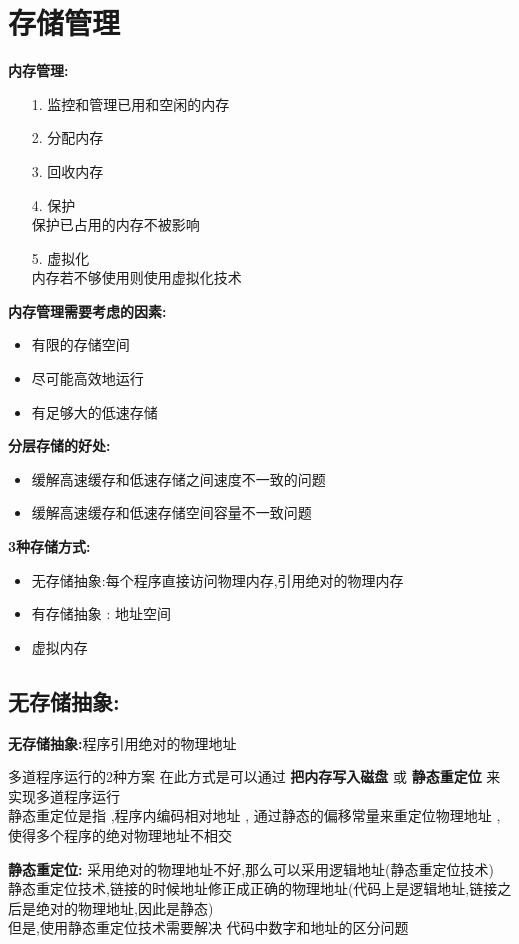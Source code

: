 \documentclass[UTF8,a4paper]{ctexart}
\newcommand{\spaceline}{\vspace{\baselineskip}}
\begin{document}
\section{存储管理}
\textbf{内存管理:}
\begin{itemize}
	\item [1.] 监控和管理已用和空闲的内存
	\item [2.] 分配内存
	\item [3.] 回收内存
	\item [4.] 保护\\
	      保护已占用的内存不被影响
	\item [5.] 虚拟化\\
	      内存若不够使用则使用虚拟化技术
\end{itemize}

\spaceline
\textbf{内存管理需要考虑的因素:}
\begin{itemize}
	\item 有限的存储空间
	\item 尽可能高效地运行
	\item 有足够大的低速存储
\end{itemize}

\spaceline
\textbf{分层存储的好处:}
\begin{itemize}
	\item 缓解高速缓存和低速存储之间速度不一致的问题
	\item 缓解高速缓存和低速存储空间容量不一致问题
\end{itemize}

\textbf{3种存储方式:}
\begin{itemize}
	\item 无存储抽象:每个程序直接访问物理内存,引用绝对的物理内存
	\item 有存储抽象 : 地址空间
	\item 虚拟内存
\end{itemize}

\subsection{无存储抽象:}

\spaceline
\textbf{无存储抽象:}程序引用绝对的物理地址

多道程序运行的2种方案
在此方式是可以通过 \textbf{把内存写入磁盘} 或 \textbf{静态重定位} 来实现多道程序运行 \\
静态重定位是指 ,程序内编码相对地址 , 通过静态的偏移常量来重定位物理地址 ,使得多个程序的绝对物理地址不相交

\spaceline\textbf{静态重定位:}
采用绝对的物理地址不好,那么可以采用逻辑地址(静态重定位技术)\\
静态重定位技术,链接的时候地址修正成正确的物理地址(代码上是逻辑地址,链接之后是绝对的物理地址,因此是静态)\\
但是,使用静态重定位技术需要解决 代码中数字和地址的区分问题
\end{document}
